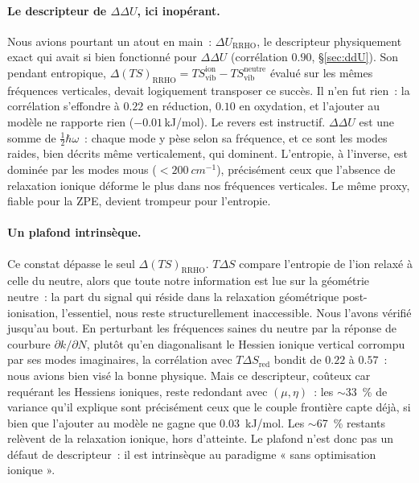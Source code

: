 \paragraph{Le descripteur de $\Delta\Delta U$, ici inopérant.}
Nous avions pourtant un atout en main~: $\Delta U_{\text{RRHO}}$, le descripteur physiquement exact qui avait si bien fonctionné pour $\Delta\Delta U$ (corrélation $0.90$, §\ref{sec:ddU}). Son pendant entropique, $\Delta(TS)_{\text{RRHO}} = TS_{\text{vib}}^{\text{ion}} - TS_{\text{vib}}^{\text{neutre}}$ évalué sur les mêmes fréquences verticales, devait logiquement transposer ce succès. Il n'en fut rien~: la corrélation s'effondre à $0.22$ en réduction, $0.10$ en oxydation, et l'ajouter au modèle ne rapporte rien ($-0.01$\,kJ/mol). Le revers est instructif. $\Delta\Delta U$ est une somme de $\tfrac12\hbar\omega$~: chaque mode y pèse selon sa fréquence, et ce sont les modes raides, bien décrits même verticalement, qui dominent. L'entropie, à l'inverse, est dominée par les modes mous ($< \SI{200}{cm^{-1}}$), précisément ceux que l'absence de relaxation ionique déforme le plus dans nos fréquences verticales. Le même proxy, fiable pour la ZPE, devient trompeur pour l'entropie.

\paragraph{Un plafond intrinsèque.}
Ce constat dépasse le seul $\Delta(TS)_{\text{RRHO}}$. $T\Delta S$ compare l'entropie de l'ion relaxé à celle du neutre, alors que toute notre information est lue sur la géométrie neutre~: la part du signal qui réside dans la relaxation géométrique post-ionisation, l'essentiel, nous reste structurellement inaccessible. Nous l'avons vérifié jusqu'au bout. En perturbant les fréquences saines du neutre par la réponse de courbure $\partial k/\partial N$\cite{cardenas2024}, plutôt qu'en diagonalisant le Hessien ionique vertical corrompu par ses modes imaginaires, la corrélation avec $T\Delta S_{\text{red}}$ bondit de $0.22$ à $0.57$~: nous avions bien visé la bonne physique. Mais ce descripteur, coûteux car requérant les Hessiens ioniques, reste redondant avec $(\mu, \eta)$~: les $\sim$33~\% de variance qu'il explique sont précisément ceux que le couple frontière capte déjà, si bien que l'ajouter au modèle ne gagne que \SI{0.03}{kJ/mol}. Les $\sim$67~\% restants relèvent de la relaxation ionique, hors d'atteinte. Le plafond n'est donc pas un défaut de descripteur~: il est intrinsèque au paradigme « sans optimisation ionique ».


